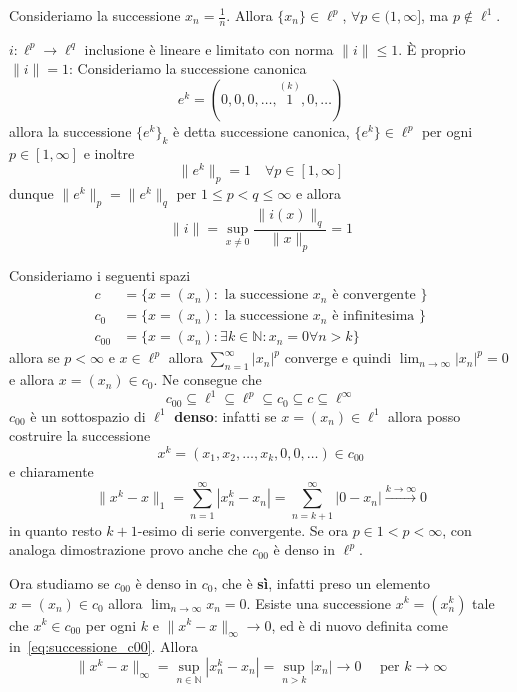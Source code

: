 \begin{example}
    Consideriamo la successione \(x_{n} = \frac{1}{n}\). Allora \(\{x_{n}\} \in
    \ell^{p}\), \(\forall p \in (1, \infty]\), ma \(p \not\in \ell^{1}\).
\end{example}
\begin{example}
    \(i : \ell^{p} \to \ell^{q} \) inclusione è lineare e limitato con norma
    \(\|i\| \le 1\). È proprio \(\|i\| = 1\): Consideriamo la successione
    canonica
    \[
        e^{k} = {(0, 0, 0, \dots, \overset{{(k)}}{1}, 0, \dots )}
    \]
    allora la successione \(\{e^{k}\}_k \) è detta successione canonica,
    \(\{e^{k}\} \in \ell^{p}\) per ogni \(p \in [1, \infty]\) e inoltre
    \[
        \|e^{k}\|_p = 1 \quad \forall p \in [1, \infty]   
    \]
    dunque \(\|e^{k}\|_p = \|e^{k}\|_q\) per \(1 \le p < q \le \infty\) e allora
    \[
        \|i\| = \sup_{x \neq 0} \frac{\|i{(x)}\|_q}{\|x\|_p} = 1
    \]
\end{example}
Consideriamo i seguenti spazi
\hypertarget{spazi_c}{\begin{align*}
    c &= \{x = {(x_{n})} : \text{ la successione \(x_{n}\) è convergente }\} \\
    c_{0} &= \{x = {(x_{n})} : \text{ la successione \(x_{n}\) è infinitesima }
    \} \\
    c_{00}  &= \{x = {(x_{n})}: \exists k \in \mathbb{N} : x_{n} = 0 \forall n >
    k\} 
\end{align*}}
allora se \(p < \infty\) e \(x \in \ell^{p}\) allora \(\sum_{n=1}^{\infty}
|x_{n}|^{p} \) converge e quindi \(\lim_{n \to \infty} |x_{n}|^{p} = 0\) e
allora \(x = {(x_{n})} \in c_{0}\). Ne consegue che
\[
    c_{00} \subseteq \ell^{1} \subseteq \ell^{p} \subseteq c_{0} \subseteq c
    \subseteq \ell^{\infty}  
\]
\(c_{00} \) è un sottospazio di \(\ell^{1}\) \textbf{denso}: infatti se \(x
= {(x_{n})} \in \ell^{1}\) allora posso costruire la successione
\begin{equation}\label{eq:successione_c00}
    x^{k} = (x_{1}, x_{2}, \dots, x_{k}, 0, 0, \dots) \in c_{00}
\end{equation}
e chiaramente 
\[
    \|x^{k} - x\|_1 = \sum_{n=1}^{\infty} |x_{n}^{k} - x_{n}| =
    \sum_{n=k+1}^{\infty} |0 - x_{n}| \overset{k \to \infty}{\longrightarrow} 0
\]
in quanto resto \(k+1\)-esimo di serie convergente. Se ora \(p \in 1 < p <
\infty\), con analoga dimostrazione provo anche che \(c_{00} \) è denso in
\(\ell^{p}\).

Ora studiamo se \(c_{00}\) è denso in \(c_{0}\), che è \textbf{sì}, infatti
preso un elemento \(x = {(x_{n})} \in c_{0} \) allora \(\lim_{n \to \infty}
x_{n} = 0\). Esiste una successione \(x^{k} = {(x_{n}^{k})}\) tale che \(x^{k} \in
c_{00} \) per ogni \(k\) e \(\|x^{k} - x\|_\infty \to 0\), ed è di nuovo
definita come in~\eqref{eq:successione_c00}. Allora
\[
    \|x^{k} - x\|_\infty = \sup_{n \in \mathbb{N}} |x_{n}^{k} - x_{n}| = \sup_{n
    > k} |x_{n}| \to 0 \quad \text{ per } k \to \infty
\]

